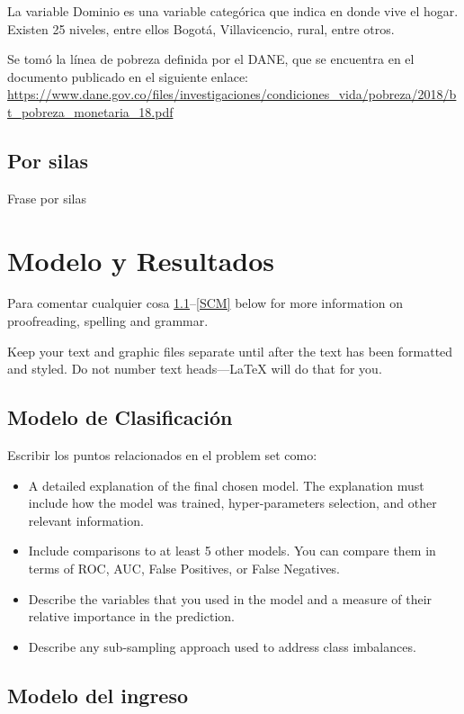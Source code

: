 \documentclass[conference, 10pt]{IEEEtran}
\begin{document}
La variable Dominio es una variable categórica que indica en donde vive el hogar. Existen 25 niveles, entre ellos Bogotá, Villavicencio, rural, entre otros. \


Se tomó la línea de pobreza definida por el DANE, que se encuentra en el documento publicado en el siguiente enlace: \url{https://www.dane.gov.co/files/investigaciones/condiciones_vida/pobreza/2018/bt_pobreza_monetaria_18.pdf}\\ 
\subsection{Por silas}

Frase por silas

\section{Modelo y Resultados}
Para comentar cualquier cosa \ref{AA}--\ref{SCM} below for more information on 
proofreading, spelling and grammar.

Keep your text and graphic files separate until after the text has been 
formatted and styled. Do not number text heads---{\LaTeX} will do that 
for you.

\subsection{Modelo de Clasificación}\label{AA}
Escribir los puntos relacionados en el problem set como:

\begin{itemize}
\item A detailed explanation of the final chosen model. The explanation must include how the model was trained, hyper-parameters selection, and other relevant information.
\item Include comparisons to at least 5 other models. You can compare them in terms of ROC, AUC, False Positives, or False Negatives.
\item Describe the variables that you used in the model and a measure of their
relative importance in the prediction. 
\item Describe any sub-sampling approach used to address class imbalances.
\end{itemize}


\subsection{Modelo del ingreso}
\end{document}
